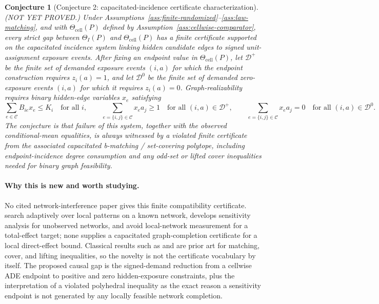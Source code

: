 \documentclass[11pt]{article}
\theoremstyle{definition}
\theoremstyle{plain}
\newtheorem{conjecture}{Conjecture}
\theoremstyle{remark}
\begin{document}
\begin{conjecture}[Conjecture 2: capacitated-incidence certificate characterization]\label{conj:cut-certificate}
(NOT YET PROVED.)  Under Assumptions~\ref{ass:finite-randomized}--\ref{ass:law-matching}, and with \(\Theta_{\mathrm{cell}}(P)\) defined by Assumption~\ref{ass:cellwise-comparator}, every strict gap between \(\Theta_I(P)\) and \(\Theta_{\mathrm{cell}}(P)\) has a finite certificate supported on the capacitated incidence system linking hidden candidate edges to signed unit-assignment exposure events.  After fixing an endpoint value in \(\Theta_{\mathrm{cell}}(P)\), let \(\mathcal D^+\) be the finite set of demanded exposure events \((i,a)\) for which the endpoint construction requires \(z_i(a)=1\), and let \(\mathcal D^0\) be the finite set of demanded zero-exposure events \((i,a)\) for which it requires \(z_i(a)=0\).  Graph-realizability requires binary hidden-edge variables \(x_e\) satisfying
\[
\sum_{e\in\mathcal C}B_{ie}x_e\le K_i\quad\text{for all }i,
\qquad
\sum_{e=\{i,j\}\in\mathcal C}x_ea_j\ge 1\quad\text{for all }(i,a)\in\mathcal D^+,
\qquad
\sum_{e=\{i,j\}\in\mathcal C}x_ea_j=0\quad\text{for all }(i,a)\in\mathcal D^0.
\]
The conjecture is that failure of this system, together with the observed conditional-mean equalities, is always witnessed by a violated finite certificate from the associated capacitated b-matching / set-covering polytope, including endpoint-incidence degree consumption and any odd-set or lifted cover inequalities needed for binary graph feasibility.
\end{conjecture}
\paragraph{Why this is new and worth studying.}
No cited network-interference paper gives this finite compatibility certificate.  \citet{BelloniFangVolfovsky2022} search adaptively over local patterns on a known network, \citet{Egami2020} develops sensitivity analysis for unobserved networks, and \citet{YuAiroldiBorgsChayes2022} avoid local-network measurement for a total-effect target; none supplies a capacitated graph-completion certificate for a local direct-effect bound.  Classical results such as \citet{Edmonds1965} and \citet{Wolsey1975} are prior art for matching, cover, and lifting inequalities, so the novelty is not the certificate vocabulary by itself.  The proposed causal gap is the signed-demand reduction from a cellwise ADE endpoint to positive and zero hidden-exposure constraints, plus the interpretation of a violated polyhedral inequality as the exact reason a sensitivity endpoint is not generated by any locally feasible network completion.
\end{document}
